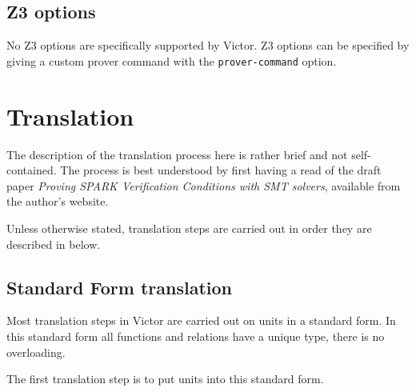 \documentclass[12pt,fleqn]{article}
\newcommand{\zthree}{\textsc{Z}3}
\newcommand{\optionb}[1]{\item[\texttt{-{#1}}]\ \\}
\begin{document}
\subsection{Z3 options}

No \zthree{} options are specifically supported by Victor.  \zthree{} options
can be specified by giving a custom prover command with the \texttt{prover-command} option.




\section{Translation}
\label{sec:translation}


The description of the translation
process here is rather brief and not self-contained.
%
The process is best understood by first having a read of the
draft paper \emph{Proving SPARK Verification Conditions with SMT solvers},
available from the author's website.

Unless otherwise stated, translation steps are carried out in order
they are described in below.

\subsection{Standard Form translation}

Most translation steps in Victor are carried out on units in a standard form.
In this standard form all functions and relations have a unique type, 
there is no overloading.

The first translation step is to put units into this standard form.

\end{document}
